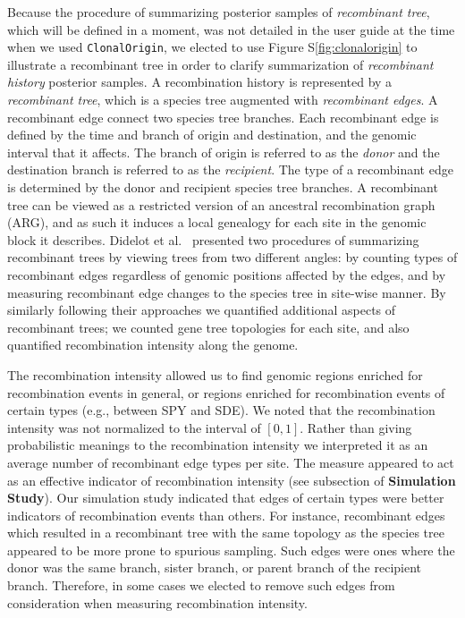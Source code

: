 \documentclass[10pt]{article}
\let\citet\cite
\begin{document}
Because the procedure of summarizing posterior samples of \textit{recombinant
tree}, which will be defined in a moment, was not detailed in the user guide at
the time when we used \texttt{ClonalOrigin}, we elected to use Figure
S\ref{fig:clonalorigin} to illustrate a recombinant tree in order to clarify
summarization of \textit{recombinant history} posterior samples.  A
recombination history is represented by a \textit{recombinant tree}, which is a
species tree augmented with \textit{recombinant edges}.  A recombinant edge
connect two species tree branches.  Each recombinant edge is defined by the time
and branch of origin and destination, and the genomic interval that it affects.
The branch of origin is referred to as the \textit{donor} and the destination
branch is referred to as the \textit{recipient}. The type of a recombinant edge
is determined by the donor and recipient species tree branches.  A recombinant
tree can be viewed as a restricted version of an ancestral recombination graph
(ARG), and as such it induces a local genealogy for each site in the genomic
block it describes.  Didelot et al.\ \citet{Didelot2010} presented two procedures of summarizing
recombinant trees by viewing trees from two different angles: by counting types
of recombinant edges regardless of genomic positions affected by the edges, and
by measuring recombinant edge changes to the species tree in site-wise manner.
By similarly following their approaches we quantified additional aspects of
recombinant trees; we counted gene tree topologies for each site, and also
quantified recombination intensity along the genome.

The recombination intensity allowed us to find genomic regions enriched for
recombination events in general, or regions enriched for recombination events of
certain types (e.g., between SPY and SDE).  We noted that the recombination
intensity was not normalized to the interval of $[0,1]$. Rather than giving
probabilistic meanings to the recombination intensity we interpreted it as an
average number of recombinant edge types per site.  The measure appeared to act
as an effective indicator of recombination intensity (see subsection of
\textbf{Simulation Study}).  Our simulation study indicated that edges of
certain types were better indicators of recombination events than others.  For
instance, recombinant edges which resulted in a recombinant tree with the same
topology as the species tree appeared to be more prone to spurious sampling.
Such edges were ones where the donor was the same branch, sister branch, or
parent branch of the recipient branch.  Therefore, in some cases we elected to
remove such edges from consideration when measuring recombination intensity.  
\end{document}
